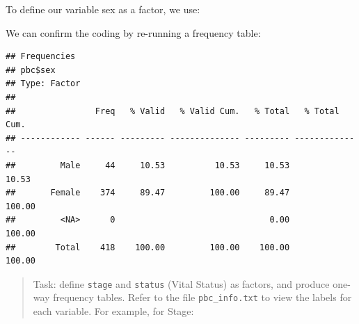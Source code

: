 \documentclass[
]{memoir}
\newenvironment{Shaded}{\begin{snugshade}}{\end{snugshade}}
\newcommand{\AttributeTok}[1]{\textcolor[rgb]{0.77,0.63,0.00}{#1}}
\newcommand{\DecValTok}[1]{\textcolor[rgb]{0.00,0.00,0.81}{#1}}
\newcommand{\FunctionTok}[1]{\textcolor[rgb]{0.00,0.00,0.00}{#1}}
\newcommand{\NormalTok}[1]{#1}
\newcommand{\OtherTok}[1]{\textcolor[rgb]{0.56,0.35,0.01}{#1}}
\newcommand{\SpecialCharTok}[1]{\textcolor[rgb]{0.00,0.00,0.00}{#1}}
\newcommand{\StringTok}[1]{\textcolor[rgb]{0.31,0.60,0.02}{#1}}
\begin{document}
To define our variable sex as a factor, we use:

\begin{Shaded}
\end{Shaded}

We can confirm the coding by re-running a frequency table:

\begin{Shaded}
\end{Shaded}

\begin{verbatim}
## Frequencies  
## pbc$sex  
## Type: Factor  
## 
##                Freq   % Valid   % Valid Cum.   % Total   % Total Cum.
## ------------ ------ --------- -------------- --------- --------------
##         Male     44     10.53          10.53     10.53          10.53
##       Female    374     89.47         100.00     89.47         100.00
##         <NA>      0                               0.00         100.00
##        Total    418    100.00         100.00    100.00         100.00
\end{verbatim}

\begin{quote}
Task: define \texttt{stage} and \texttt{status} (Vital Status) as factors, and produce one-way frequency tables. Refer to the file \texttt{pbc\_info.txt} to view the labels for each variable. For example, for Stage:
\end{quote}

\begin{Shaded}
\end{Shaded}
\end{document}
